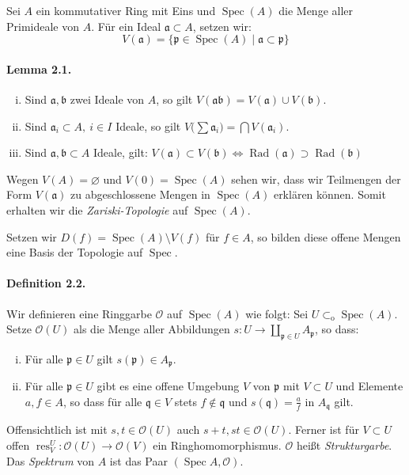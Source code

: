 \documentclass[11pt,b5paper,openany]{memoir}
\begin{document}
Sei $A$ ein kommutativer Ring mit Eins und $\operatorname{Spec}(A)$ die Menge aller Primideale von $A$. Für ein Ideal $\mathfrak{a}\subset A$, setzen wir:
\[V(\mathfrak{a}) = \{\mathfrak{p}\in\operatorname{Spec}(A)\mid \mathfrak{a}\subset\mathfrak{p}\} \]

\paragraph{Lemma 2.1.}\label{2.1} \begin{enumerate}[(i)]
\item Sind $\mathfrak{a},\mathfrak{b}$ zwei Ideale von $A$, so gilt $V(\mathfrak{ab})=V(\mathfrak{a})\cup V(\mathfrak{b})$.
\item Sind $\mathfrak{a}_i\subset A,\ i\in I$ Ideale, so gilt $V\big(\sum\mathfrak{a}_i\big)=\bigcap V(\mathfrak{a}_i)$.
\item Sind $\mathfrak{a},\mathfrak{b}\subset A$ Ideale, gilt: $V(\mathfrak{a})\subset V(\mathfrak{b}) \iff \operatorname{Rad}(\mathfrak{a})\supset\operatorname{Rad}(\mathfrak{b})$
\end{enumerate}
Wegen $V(A)=\varnothing$ und $V(0)=\operatorname{Spec}(A)$ sehen wir, dass wir Teilmengen der Form $V(\mathfrak{a})$ zu abgeschlossene Mengen in $\operatorname{Spec}(A)$ erklären können. Somit erhalten wir die \textit{Zariski-Topologie} auf $\operatorname{Spec}(A)$.

Setzen wir $D(f)=\operatorname{Spec}(A)\setminus V(f)$ für $f\in A$, so bilden diese offene Mengen eine Basis der Topologie auf $\operatorname{Spec}$.

\paragraph{Definition 2.2.}\label{2.2} Wir definieren eine Ringgarbe $\mathcal{O}$ auf $\operatorname{Spec}(A)$ wie folgt: Sei $U\subset_\text{o}\operatorname{Spec}(A)$. Setze $\mathcal{O}(U)$ als die Menge aller Abbildungen $s:U\to\coprod_{\mathfrak{p}\in U}A_\mathfrak{p}$, so dass:
\begin{enumerate}[(i)]
\item Für alle $\mathfrak{p}\in U$ gilt $s(\mathfrak{p})\in A_\mathfrak{p}$.
\item Für alle $\mathfrak{p}\in U$ gibt es eine offene Umgebung $V$ von $\mathfrak{p}$ mit $V\subset U$ und Elemente $a,f\in A$, so dass für alle $\mathfrak{q}\in V$ stets $f\not\in\mathfrak{q}$ und $s(\mathfrak{q})=\frac{a}{f}$ in $A_\mathfrak{q}$ gilt.
\end{enumerate}
Offensichtlich ist mit $s,t\in\mathcal{O}(U)$ auch $s+t,st\in\mathcal{O}(U)$. Ferner ist für $V\subset U$ offen $\operatorname{res}^U_V:\mathcal{O}(U)\to\mathcal{O}(V)$ ein Ringhomomorphismus. $\mathcal{O}$ heißt \textit{Strukturgarbe}. Das \textit{Spektrum} von $A$ ist das Paar $(\operatorname{Spec}A,\mathcal{O})$.
\end{document}

